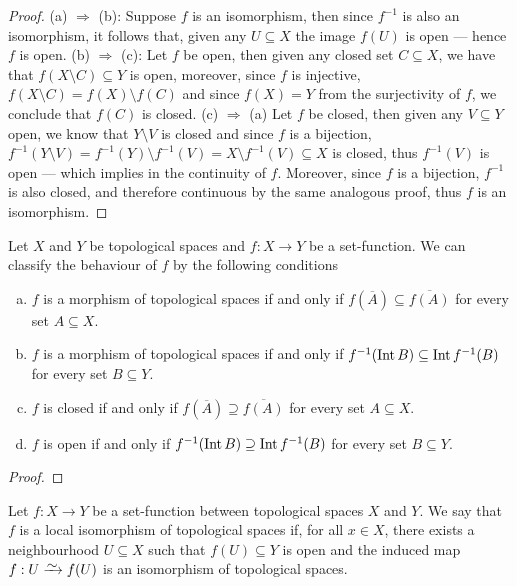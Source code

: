 \begin{proof}
(a) \(\Rightarrow\) (b): Suppose \(f\) is an isomorphism, then since \(f^{-1}\)
is also an isomorphism, it follows that, given any \(U \subseteq X\) the image
\(f(U)\) is open --- hence \(f\) is open. (b) \(\Rightarrow\) (c): Let \(f\) be
open, then given any closed set \(C \subseteq X\), we have that \(f(X \setminus
C) \subseteq Y\) is open, moreover, since \(f\) is injective, \(f(X \setminus C)
= f(X) \setminus f(C)\) and since \(f(X) = Y\) from the surjectivity of \(f\),
we conclude that \(f(C)\) is closed. (c) \(\Rightarrow\) (a) Let \(f\) be
closed, then given any \(V \subseteq Y\) open, we know that \(Y \setminus V\) is
closed and since \(f\) is a bijection, \(f^{-1}(Y \setminus V) = f^{-1}(Y)
\setminus f^{-1}(V) = X \setminus f^{-1}(V) \subseteq X\) is closed, thus
\(f^{-1}(V)\) is open --- which implies in the continuity of \(f\). Moreover,
since \(f\) is a bijection, \(f^{-1}\) is also closed, and therefore continuous
by the same analogous proof, thus \(f\) is an isomorphism.
\end{proof}

\begin{proposition}\label{prop:classification-maps-interior-closure}
Let \(X\) and \(Y\) be topological spaces and \(f: X \to Y\) be a
set-function. We can classify the behaviour of \(f\) by the following conditions
\begin{enumerate}[(a)]\setlength\itemsep{0em}
\item \(f\) is a morphism of topological spaces if and only if \(f(\overline{A})
  \subseteq \overline{f(A)}\) for every set \(A \subseteq X\).
\item \(f\) is a morphism of topological spaces if and only if \(f^{-1}(\operatorname{Int} B)
  \subseteq \operatorname{Int} f^{-1}(B)\) for every set \(B \subseteq Y\).
\item \(f\) is closed if and only if \(f(\overline{A}) \supseteq
  \overline{f(A)}\) for every set \(A \subseteq X\).
\item \(f\) is open if and only if \(f^{-1}(\operatorname{Int} B) \supseteq \operatorname{Int} f^{-1}(B)\)
  for every set \(B \subseteq Y\).
\end{enumerate}
\end{proposition}

\begin{proof}
\end{proof}

\begin{definition}
\label{def:local-homeomorphism}
Let \(f: X \to Y\) be a set-function between topological spaces \(X\) and
\(Y\). We say that \(f\) is a local isomorphism of topological spaces if, for
all \(x \in X\), there exists a neighbourhood \(U \subseteq X\) such that \(f(U)
\subseteq Y\) is open and the induced map \(f: U \isoto f(U)\) is an isomorphism
of topological spaces.
\end{definition}

